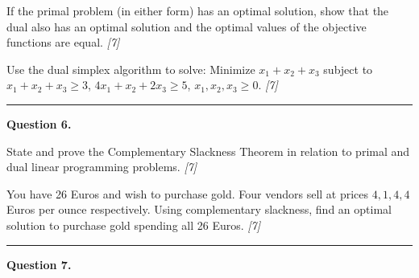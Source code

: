 \documentclass[11pt,a4paper]{article}
\newcommand{\pts}[1]{\hfill   \textit{[#1]}}
\begin{document}
\begin{parts}
  \item If the primal problem (in either form) has an optimal solution, show that the dual also has an optimal solution and the optimal values of the objective functions are equal. \pts{7}
  \item Use the dual simplex algorithm to solve: Minimize $x_1 + x_2 + x_3$ subject to $x_1 + x_2 + x_3 \ge 3$, $4x_1 + x_2 + 2x_3 \ge 5$, $x_1, x_2, x_3 \ge 0$. \pts{7}
\end{parts}

\medskip\rule{\linewidth}{0.2pt}

\medskip


\noindent   \textbf{Question 6.}

\begin{parts}
  \item State and prove the Complementary Slackness Theorem in relation to primal and dual linear programming problems. \pts{7}
  \item You have 26 Euros and wish to purchase gold. Four vendors sell at prices $4, 1, 4, 4$ Euros per ounce respectively. Using complementary slackness, find an optimal solution to purchase gold spending all 26 Euros. \pts{7}
\end{parts}

\medskip\rule{\linewidth}{0.2pt}

\medskip


\noindent   \textbf{Question 7.}
\end{document}
